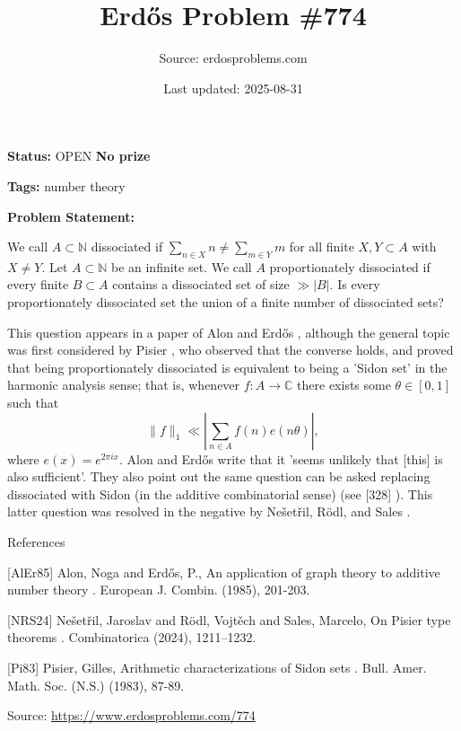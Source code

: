 \documentclass{article}
\title{Erd\H{o}s Problem \#774}
\date{Last updated: 2025-08-31}
\author{Source: erdosproblems.com}
\begin{document}
\maketitle

\noindent\textbf{Status:} OPEN \quad \textbf{No prize}

\noindent\textbf{Tags:} number theory

\medskip

\noindent\textbf{Problem Statement:}

We call $A\subset \mathbb{N}$ dissociated if $\sum_{n\in X}n\neq \sum_{m\in Y}m$ for all finite $X,Y\subset A$ with $X\neq Y$. Let $A\subset \mathbb{N}$ be an infinite set. We call $A$ proportionately dissociated if every finite $B\subset A$ contains a dissociated set of size $\gg \lvert B\rvert$. Is every proportionately dissociated set the union of a finite number of dissociated sets?




This question appears in a paper of Alon and Erd\H{o}s \cite{AlEr85}, although the general topic was first considered by Pisier \cite{Pi83}, who observed that the converse holds, and proved that being proportionately dissociated is equivalent to being a 'Sidon set' in the harmonic analysis sense; that is, whenever $f:A\to \mathbb{C}$ there exists some $\theta\in [0,1]$ such that\[\| f\|_1 \ll \left\lvert\sum_{n\in A} f(n)e(n\theta)\right\rvert,\]where $e(x)=e^{2\pi ix}$. Alon and Erd\H{o}s write that it 'seems unlikely that [this] is also sufficient'. They also point out the same question can be asked replacing dissociated with Sidon (in the additive combinatorial sense) (see [328] ). This latter question was resolved in the negative by Ne\v{s}et\v{r}il, R\"{o}dl, and Sales \cite{NRS24}.




References

[AlEr85] Alon, Noga and Erd\H{o}s, P., An application of graph theory to additive number theory . European J. Combin. (1985), 201-203.

[NRS24] Ne\v set\v ril, Jaroslav and R\"odl, Vojt\v ech and Sales, Marcelo, On {P}isier type theorems . Combinatorica (2024), 1211--1232.

[Pi83] Pisier, Gilles, Arithmetic characterizations of Sidon sets . Bull. Amer. Math. Soc. (N.S.) (1983), 87-89.


\bigskip
\noindent\small{Source: \url{https://www.erdosproblems.com/774}}
\end{document}
